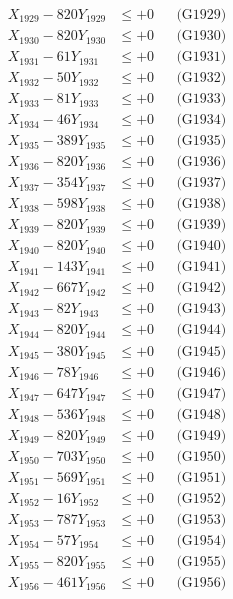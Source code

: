 \documentclass[a4paper,10pt]{article}
\begin{document}
{\begin{align}
X_{1929} - 820Y_{1929} &\leq +0 && \text{(G1929)} \\
X_{1930} - 820Y_{1930} &\leq +0 && \text{(G1930)} \\
\allowbreak
X_{1931} - 61Y_{1931} &\leq +0 && \text{(G1931)} \\
X_{1932} - 50Y_{1932} &\leq +0 && \text{(G1932)} \\
X_{1933} - 81Y_{1933} &\leq +0 && \text{(G1933)} \\
X_{1934} - 46Y_{1934} &\leq +0 && \text{(G1934)} \\
X_{1935} - 389Y_{1935} &\leq +0 && \text{(G1935)} \\
X_{1936} - 820Y_{1936} &\leq +0 && \text{(G1936)} \\
X_{1937} - 354Y_{1937} &\leq +0 && \text{(G1937)} \\
X_{1938} - 598Y_{1938} &\leq +0 && \text{(G1938)} \\
X_{1939} - 820Y_{1939} &\leq +0 && \text{(G1939)} \\
X_{1940} - 820Y_{1940} &\leq +0 && \text{(G1940)} \\
\allowbreak
X_{1941} - 143Y_{1941} &\leq +0 && \text{(G1941)} \\
X_{1942} - 667Y_{1942} &\leq +0 && \text{(G1942)} \\
X_{1943} - 82Y_{1943} &\leq +0 && \text{(G1943)} \\
X_{1944} - 820Y_{1944} &\leq +0 && \text{(G1944)} \\
X_{1945} - 380Y_{1945} &\leq +0 && \text{(G1945)} \\
X_{1946} - 78Y_{1946} &\leq +0 && \text{(G1946)} \\
X_{1947} - 647Y_{1947} &\leq +0 && \text{(G1947)} \\
X_{1948} - 536Y_{1948} &\leq +0 && \text{(G1948)} \\
X_{1949} - 820Y_{1949} &\leq +0 && \text{(G1949)} \\
X_{1950} - 703Y_{1950} &\leq +0 && \text{(G1950)} \\
\allowbreak
X_{1951} - 569Y_{1951} &\leq +0 && \text{(G1951)} \\
X_{1952} - 16Y_{1952} &\leq +0 && \text{(G1952)} \\
X_{1953} - 787Y_{1953} &\leq +0 && \text{(G1953)} \\
X_{1954} - 57Y_{1954} &\leq +0 && \text{(G1954)} \\
X_{1955} - 820Y_{1955} &\leq +0 && \text{(G1955)} \\
X_{1956} - 461Y_{1956} &\leq +0 && \text{(G1956)} \\

\end{align}}
\end{document}
